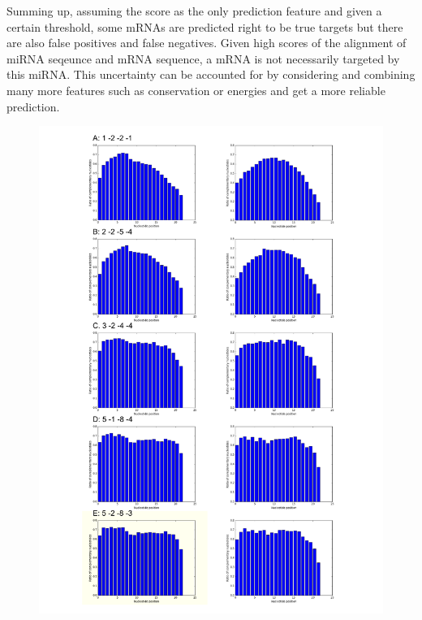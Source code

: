 \documentclass[11pt,  a4paper]{report}
\begin{document}
Summing up, assuming the score as the only prediction feature and given a certain threshold, some mRNAs are predicted right to be true targets but there are also false positives and false negatives. Given high scores of the alignment of miRNA seqeunce and mRNA sequence, a mRNA is not necessarily targeted by this miRNA. This uncertainty can be accounted for by considering and combining many more features such as conservation or energies and get a more reliable prediction.\\


\begin{figure}
\vspace{-1cm}
\hspace{-2cm}
\includegraphics[scale=0.75]{results/compl1.pdf}
\end{figure}
\end{document}

